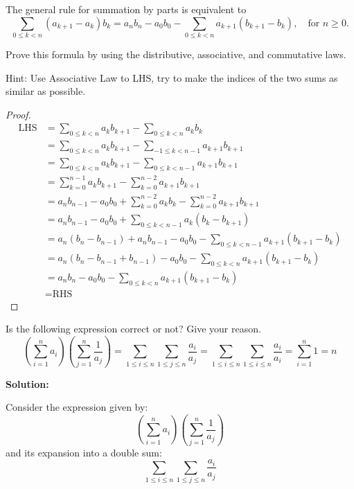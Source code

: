\begin{exercise}
    The general rule for summation by parts is equivalent to
\[
\sum_{0 \leq k < n} (a_{k+1} - a_k)b_k = a_nb_n - a_0b_0 - \sum_{0 \leq k < n} a_{k+1}(b_{k+1} - b_k), \quad \text{for } n \geq 0.
\]

Prove this formula by using the distributive, associative, and commutative laws.
\end{exercise}
Hint: Use Associative Law to LHS, try to make the indices of the two sums as similar as possible.
\begin{proof}
    \begin{align*}
        \text{LHS} &= \sum_{0\leq k < n} a_k b_{k+1} - \sum_{0\leq k < n} a_k b_k \\
        &= \sum_{0\leq k < n} a_k b_{k+1} - \sum_{-1\leq k < n-1} a_{k+1} b_{k+1} \\
        &= \sum_{0\leq k < n} a_k b_{k+1} - \sum_{0\leq k < n-1} a_{k+1} b_{k+1} \\
        &= \sum_{k=0}^{n-1} a_k b_{k+1} - \sum_{k=0}^{n-2} a_{k+1} b_{k+1} \\
        &= a_n b_{n-1} - a_0 b_0 + \sum_{k=0}^{n-2} a_k b_k - \sum_{k=0}^{n-2} a_{k+1} b_{k+1} \\
        &= a_n b_{n-1} - a_0 b_0 + \sum_{0\leq k < n-1} a_k (b_k - b_{k+1}) \\
        &= a_n (b_n - b_{n-1}) + a_n b_{n-1} - a_0 b_0 - \sum_{0\leq k < n-1} a_{k+1} (b_{k+1} - b_k) \\
        &= a_n (b_n - b_{n-1} + b_{n-1}) - a_0 b_0 - \sum_{0\leq k < n} a_{k+1} (b_{k+1} - b_k) \\
        &= a_n b_n - a_0 b_0 - \sum_{0\leq k < n} a_{k+1} (b_{k+1} - b_k) \\
        &= \text{RHS}
        \end{align*}
\end{proof}
\begin{exercise}
    Is the following expression correct or not? Give your reason.
    \[
\left( \sum_{i=1}^{n} a_i \right) \left( \sum_{j=1}^{n} \frac{1}{a_j} \right) = \sum_{1 \leq i \leq n} \sum_{1 \leq j \leq n} \frac{a_i}{a_j} = \sum_{1 \leq i \leq n} \sum_{1 \leq i \leq n} \frac{a_i}{a_i} = \sum_{i=1}^{n} 1 = n
\]
\end{exercise}
\textbf{Solution:}

Consider the expression given by:
\[
\left( \sum_{i=1}^{n} a_i \right) \left( \sum_{j=1}^{n} \frac{1}{a_j} \right)
\]
and its expansion into a double sum:
\[
\sum_{1 \leq i \leq n} \sum_{1 \leq j \leq n} \frac{a_i}{a_j}
\]

